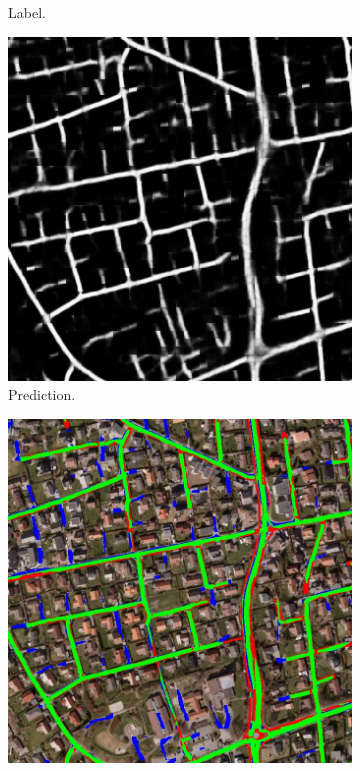 \begin{figure}[H]
\begin{subfigure}{0.23\textwidth}
\caption{Label.}
\vspace{0.1cm} %
\end{subfigure}
\hspace*{\fill} %
\begin{subfigure}{0.23\textwidth}
\includegraphics[width=\textwidth]{figs/appendix/pred1160.jpg}
\caption{Prediction.}
\vspace{0.1cm} %
\end{subfigure}
\hspace*{\fill} %
\begin{subfigure}{0.23\textwidth}
\includegraphics[width=\textwidth]{figs/appendix/hit1160.jpg}

\end{subfigure}
\end{figure}
